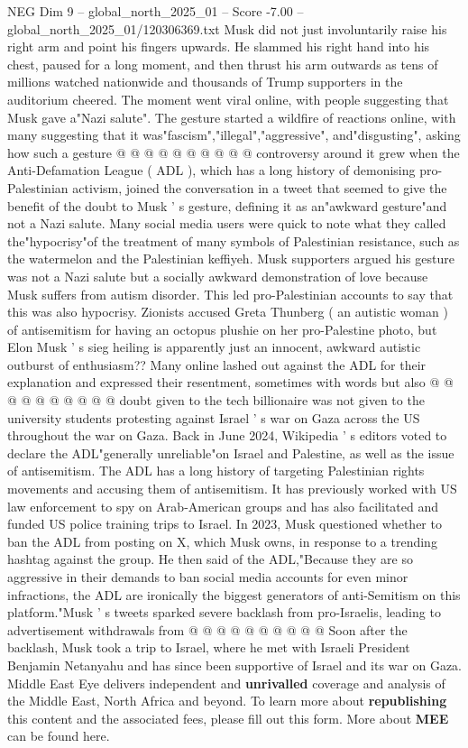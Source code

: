\begin{textsample}{NEG Dim 9 – global\_north\_2025\_01 – Score -7.00 – global\_north\_2025\_01/120306369.txt}
Musk did not just involuntarily raise his right arm and point his fingers upwards.
He slammed his right hand into his chest, paused for a long moment, and then thrust his arm outwards as tens of millions watched nationwide and thousands of Trump supporters in the auditorium cheered.
The moment went viral online, with people suggesting that Musk gave a"Nazi salute".
The gesture started a wildfire of reactions online, with many suggesting that it was"fascism","illegal","aggressive", and"disgusting", asking how such a gesture @ @ @ @ @ @ @ @ @ @ controversy around it grew when the Anti-Defamation League ( ADL ), which has a long history of demonising pro-Palestinian activism, joined the conversation in a tweet that seemed to give the benefit of the doubt to Musk ' s gesture, defining it as an"awkward gesture"and not a Nazi salute.
Many social media users were quick to note what they called the"hypocrisy"of the treatment of many symbols of Palestinian resistance, such as the watermelon and the Palestinian keffiyeh.
Musk supporters argued his gesture was not a Nazi salute but a socially awkward demonstration of love because Musk suffers from autism disorder.
This led pro-Palestinian accounts to say that this was also hypocrisy.
Zionists accused Greta Thunberg ( an autistic woman ) of antisemitism for having an octopus plushie on her pro-Palestine photo, but Elon Musk ' s sieg heiling is apparently just an innocent, awkward autistic outburst of enthusiasm??
Many online lashed out against the ADL for their explanation and expressed their resentment, sometimes with words but also @ @ @ @ @ @ @ @ @ @ doubt given to the tech billionaire was not given to the university students protesting against Israel ' s war on Gaza across the US throughout the war on Gaza.
Back in June 2024, Wikipedia ' s editors voted to declare the ADL"generally unreliable"on Israel and Palestine, as well as the issue of antisemitism.
The ADL has a long history of targeting Palestinian rights movements and accusing them of antisemitism.
It has previously worked with US law enforcement to spy on Arab-American groups and has also facilitated and funded US police training trips to Israel.
In 2023, Musk questioned whether to ban the ADL from posting on X, which Musk owns, in response to a trending hashtag against the group.
He then said of the ADL,"Because they are so aggressive in their demands to ban social media accounts for even minor infractions, the ADL are ironically the biggest generators of anti-Semitism on this platform."Musk ' s tweets sparked severe backlash from pro-Israelis, leading to advertisement withdrawals from @ @ @ @ @ @ @ @ @ @ Soon after the backlash, Musk took a trip to Israel, where he met with Israeli President Benjamin Netanyahu and has since been supportive of Israel and its war on Gaza.
Middle East Eye delivers independent and \textbf{unrivalled} coverage and analysis of the Middle East, North Africa and beyond.
To learn more about \textbf{republishing} this content and the associated fees, please fill out this form.
More about \textbf{MEE} can be found here.

\end{textsample}
